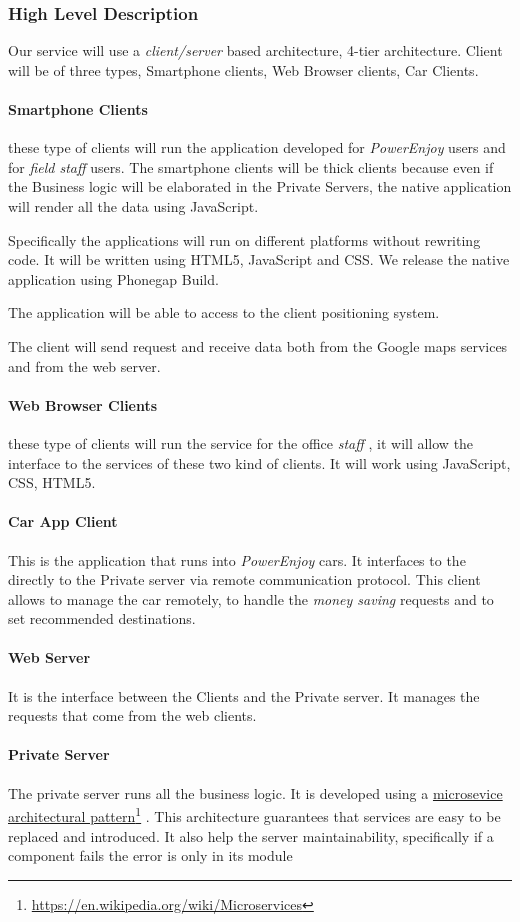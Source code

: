 \documentclass[english]{article}
\newcommand\fnurl[2]{%
	\href{#2}{#1}\footnote{\url{#2}}%
}
\newcommand{\powerenjoy}{\textit{PowerEnjoy }}
\newcommand{\staff}{\textit{staff }}
\newcommand{\fieldstaff}{\textit{field staff }}
\newcommand{\moneysaving}{\textit{money saving }}
\begin{document}
	\subsubsection{High Level Description}
	Our service will use a \textit{client/server} based architecture, 4-tier architecture. Client will be of three types, Smartphone clients, Web Browser clients, Car Clients.
	\paragraph{Smartphone Clients} these type of clients will run the application developed for \powerenjoy users and for \fieldstaff users. The smartphone clients will be thick clients because even  if the Business logic will be elaborated in the Private Servers, the native application will render all the data using JavaScript. 
		\par Specifically the applications will run on different platforms without rewriting code. It will be written using HTML5, JavaScript and CSS. We release the native application using Phonegap Build. 
		\par The application will be able to access to the client positioning system.
		\par The client will send request and receive data both from the Google maps services and from the web server.
	\paragraph{Web Browser Clients} these type of clients will run the service for the office \staff, it will allow the interface to the services of these two kind of clients. It will work using JavaScript, CSS, HTML5. 
	\paragraph{Car App Client} 
	This is the application that runs into \powerenjoy cars. It interfaces to the directly to the Private server via remote communication protocol. This client allows to manage the car remotely, to handle the \moneysaving requests and to set recommended destinations.
	\paragraph{Web Server}
	It is the interface between the Clients and the Private server. It manages the requests that come from the web clients. 
	\paragraph{Private Server}
	The private server runs all the business logic. It is developed using a \fnurl{microsevice architectural pattern}{https://en.wikipedia.org/wiki/Microservices}. This architecture guarantees that services are easy to be replaced and introduced. It also help the server maintainability, specifically if a component fails the error is only in its module
\end{document}
